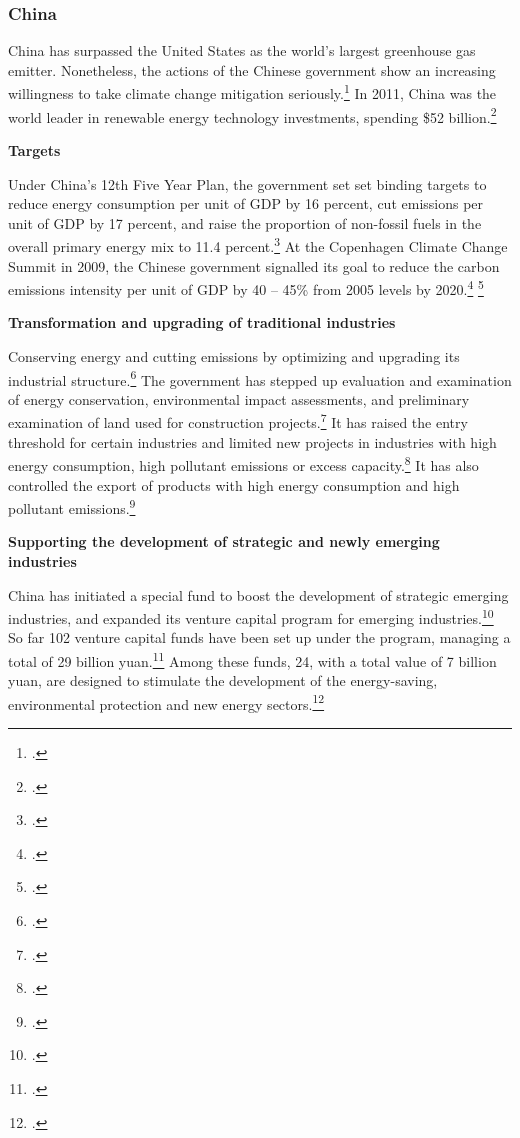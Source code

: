 	\subsubsection{China}
	
	

China has surpassed the United States as the world’s largest greenhouse gas emitter.
Nonetheless, the actions of the Chinese government show an increasing willingness to take climate change mitigation seriously.\footcite[][]{ChinaTopEmission}
In 2011, China was the world leader in renewable energy technology investments, spending \$52 billion.\footcite[][]{RenewableInvestment}



\textbf{Targets}



Under China's 12th Five Year Plan, the government set set binding targets to reduce energy consumption per unit of GDP by 16 percent, cut  emissions per unit of GDP by 17 percent, and raise the proportion of non-fossil fuels in the overall primary energy mix to 11.4 percent.\footcite[][]{FiveYearPlan}
At the Copenhagen Climate Change Summit in 2009, the Chinese government signalled its goal to reduce the carbon emissions intensity per unit of GDP by 40 -- 45\% from 2005 levels by 2020.\footcite[][p. 108]{UNHumanDev2013} \footcite[][]{FiveYearPlan}



\textbf{Transformation and upgrading of traditional industries}



Conserving energy and cutting emissions by optimizing and upgrading its industrial structure.\footcite[][]{ChinaRestructuring}
The government has stepped up evaluation and examination of energy conservation, environmental impact assessments, and preliminary examination of land used for construction projects.\footcite[][]{ChinaRestructuring}
It has raised the entry threshold for certain industries and limited new projects in industries with high energy consumption, high pollutant emissions or excess capacity.\footcite[][]{ChinaRestructuring}
It has also controlled the export of products with high energy consumption and high pollutant emissions.\footcite[][]{ChinaRestructuring}



\textbf{Supporting the development of strategic and newly emerging industries}



China has initiated a special fund to boost the development of strategic emerging industries, and expanded its venture capital program for emerging industries.\footcite[][]{EmergingIndustries}
So far 102 venture capital funds have been set up under the program, managing a total of 29 billion yuan.\footcite[][]{EmergingIndustries}
Among these funds, 24, with a total value of 7 billion yuan, are designed to stimulate the development of the energy-saving, environmental protection and new energy sectors.\footcite[][]{EmergingIndustries}




